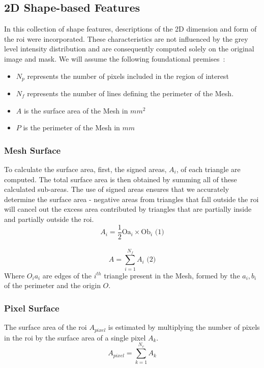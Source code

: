 \subsection{2D Shape-based Features}
In this collection of shape features, descriptions of the 2D dimension and form of the \ac{roi} were incorporated. These characteristics are not influenced by the grey level intensity distribution and are consequently computed solely on the original image and mask.
We will assume the following foundational premises~\cite{van_griethuysen_computational_2017}:
\begin{itemize}
    \item $N_p$ represents the number of pixels included in the region of interest
    \item $N_f$ represents the number of lines defining the perimeter of the Mesh.
    \item $A$ is the surface area of the Mesh in $mm^2$
    \item $P$ is the perimeter of the Mesh in $mm$
\end{itemize}

\subsubsection*{Mesh Surface}
To calculate the surface area, first, the signed areas, \(A_i\), of each triangle are computed. The total surface area is then obtained by summing all of these calculated sub-areas. The use of signed areas ensures that we accurately determine the surface area - negative areas from triangles that fall outside the \ac{roi} will cancel out the excess area contributed by triangles that are partially inside and partially outside the \ac{roi}.
\begin{equation}
    A_i = \frac{1}{2}\text{Oa}_i \times \text{Ob}_i \text{ (1)}
\end{equation} \\
\begin{equation}
    A = \displaystyle\sum^{N_f}_{i=1}{A_i} \text{ (2)}
\end{equation}
Where $O_ia_i$ are edges of the $i^{th}$ triangle present in the Mesh, formed by the $a_i,b_i$ of the perimeter and the origin $O$.

\subsubsection*{Pixel Surface}
The surface area of the \ac{roi} $A_{pixel}$ is estimated by multiplying the number of pixels in the \ac{roi} by the surface area of a single pixel $A_k$.
\begin{equation}
    A_{pixel} = \displaystyle\sum^{N_v}_{k=1}{A_k}    
\end{equation}

